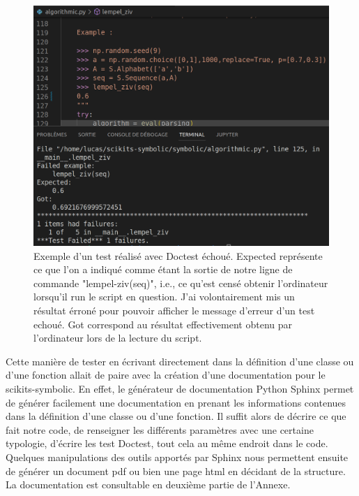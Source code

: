 \begin{figure}[!ht]
    \centering
    \includegraphics[width=13cm]{exemple_doctest.png}
    \caption{Exemple d'un test réalisé avec Doctest échoué. Expected représente ce que l'on a indiqué comme étant la sortie de notre ligne de commande "lempel-ziv(seq)", i.e., ce qu'est censé obtenir l'ordinateur lorsqu'il run le script en question. J'ai volontairement mis un résultat érroné pour pouvoir afficher le message d'erreur d'un test echoué. Got correspond au résultat effectivement obtenu par l'ordinateur lors de la lecture du script.}
    \label{fig5.3}
\end{figure}

\vspace{2ex}
Cette manière de tester en écrivant directement dans la définition d'une classe ou d'une fonction allait de paire avec la création d'une documentation pour le scikits-symbolic. En effet, le générateur de documentation Python Sphinx permet de générer facilement une documentation en prenant les informations contenues dans la définition d'une classe ou d'une fonction. Il suffit alors de décrire ce que fait notre code, de renseigner les différents paramètres avec une certaine typologie, d'écrire les test Doctest, tout cela au même endroit dans le code. Quelques manipulations des outils apportés par Sphinx nous permettent ensuite de générer un document pdf ou bien une page html en décidant de la structure. La documentation est consultable en deuxième partie de l'Annexe.
